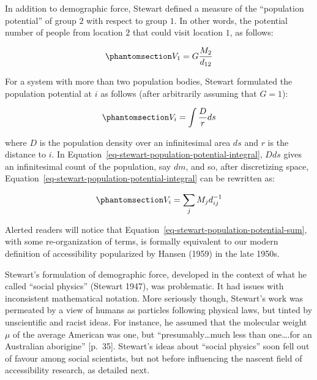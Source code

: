 \documentclass[
]{article}
\begin{document}
In addition to demographic force, Stewart defined a measure of the
``population potential'' of group \(2\) with respect to group \(1\). In
other words, the potential number of people from location \(2\) that
could visit location \(1\), as follows:

\begin{equation}\phantomsection\label{eq-stewart-population-potential}{
V_1 = G\frac{M_2}{d_{12}}
}\end{equation}

For a system with more than two population bodies, Stewart formulated
the population potential at \(i\) as follows (after arbitrarily assuming
that \(G=1\)):

\begin{equation}\phantomsection\label{eq-stewart-population-potential-integral}{
V_i = \int\frac{D}{r} ds
}\end{equation}

\noindent where \(D\) is the population density over an infinitesimal
area \(ds\) and \(r\) is the distance to \(i\). In
Equation~\ref{eq-stewart-population-potential-integral}, \(D ds\) gives
an infinitesimal count of the population, say \(dm\), and so, after
discretizing space,
Equation~\ref{eq-stewart-population-potential-integral} can be rewritten
as:

\begin{equation}\phantomsection\label{eq-stewart-population-potential-sum}{
V_i = \sum_j M_jd_{ij}^{-1}
}\end{equation}

Alerted readers will notice that
Equation~\ref{eq-stewart-population-potential-sum}, with some
re-organization of terms, is formally equivalent to our modern
definition of accessibility popularized by Hansen (1959) in the late
1950s.

Stewart's formulation of demographic force, developed in the context of
what he called ``social physics'' (Stewart 1947), was problematic. It
had issues with inconsistent mathematical notation. More seriously
though, Stewart's work was permeated by a view of humans as particles
following physical laws, but tinted by unscientific and racist ideas.
For instance, he assumed that the molecular weight \(\mu\) of the
average American was one, but ``presumably\ldots much less than
one\ldots.for an Australian aborigine'' {[}p.~35{]}. Stewart's ideas
about ``social physics'' soon fell out of favour among social
scientists, but not before influencing the nascent field of
accessibility research, as detailed next.
\end{document}
